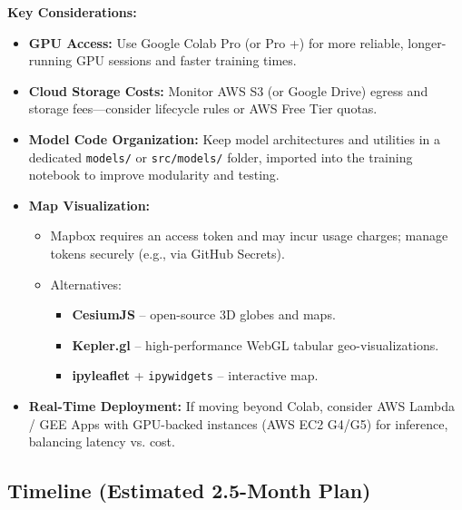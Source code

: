 \documentclass{article}
\begin{document}
\vspace{0.5cm}
\textbf{Key Considerations:}
\begin{itemize}
  \item \textbf{GPU Access:} Use Google Colab Pro (or Pro +) for more reliable, longer-running GPU sessions and faster training times.
  \item \textbf{Cloud Storage Costs:} Monitor AWS S3 (or Google Drive) egress and storage fees—consider lifecycle rules or AWS Free Tier quotas.
  \item \textbf{Model Code Organization:} Keep model architectures and utilities in a dedicated \texttt{models/} or \texttt{src/models/} folder, imported into the training notebook to improve modularity and testing.
  \item \textbf{Map Visualization:}
    \begin{itemize}[noitemsep]
      \item Mapbox requires an access token and may incur usage charges; manage tokens securely (e.g., via GitHub Secrets).
      \item Alternatives:
        \begin{itemize}[noitemsep]
          \item \textbf{CesiumJS} – open-source 3D globes and maps.
          \item \textbf{Kepler.gl} – high-performance WebGL tabular geo-visualizations.
          \item \textbf{ipyleaflet} + \texttt{ipywidgets} – interactive map.
        \end{itemize}
    \end{itemize}
  \item \textbf{Real-Time Deployment:} If moving beyond Colab, consider AWS Lambda / GEE Apps with GPU-backed instances (AWS EC2 G4/G5) for inference, balancing latency vs. cost.
  \end{itemize}

\clearpage

\subsection{Timeline (Estimated 2.5-Month Plan)}
\end{document}
